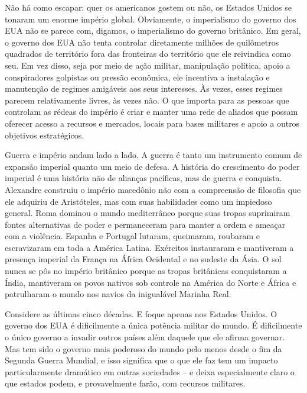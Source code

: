 Não há como escapar: quer os americanos gostem ou não, os Estados Unidos se tonaram um enorme império global. Obviamente, o imperialismo do governo dos EUA não se parece com, digamos, o imperialismo do governo britânico. Em geral, o governo dos EUA não tenta controlar diretamente milhões de quilômetros quadrados de território fora das fronteiras do território que ele reivindica como seu. Em vez disso, seja por meio de ação militar, manipulação política, apoio a conspiradores golpistas ou pressão econômica, ele incentiva a instalação e manutenção de regimes amigáveis aos seus interesses. Às vezes, esses regimes parecem relativamente livres, às vezes não. O que importa para as pessoas que controlam as rédeas do império é criar e manter uma rede de aliados que possam oferecer acesso a recursos e mercados, locais para bases militares e apoio a outros objetivos estratégicos.

Guerra e império andam lado a lado. A guerra é tanto um instrumento comum de expansão imperial quanto um meio de defesa. A história do crescimento do poder imperial é uma história não de alianças pacíficas, mas de guerra e conquista. Alexandre construiu o império macedônio não com a compreensão de filosofia que ele adquiriu de Aristóteles, mas com suas habilidades como um impiedoso general. Roma dominou o mundo mediterrâneo porque suas tropas suprimiram fontes alternativas de poder e permaneceram para manter a ordem e ameaçar com a violência. Espanha e Portugal lutaram, queimaram, roubaram e escravizaram em toda a América Latina. Exércitos instauraram e mantiveram a presença imperial da França na África Ocidental e no sudeste da Ásia. O sol nunca se pôs no império britânico porque as tropas britânicas conquistaram a Índia, mantiveram os povos nativos sob controle na América do Norte e África e patrulharam o mundo nos navios da inigualável Marinha Real.

Considere as últimas cinco décadas. E foque apenas nos Estados Unidos. O governo dos EUA é dificilmente a única potência militar do mundo. É dificilmente o único governo a invadir outros países além daquele que ele afirma governar. Mas tem sido o governo mais poderoso do mundo pelo menos desde o fim da Segunda Guerra Mundial, e isso significa que o que ele faz tem um impacto particularmente dramático em outras sociedades -- e deixa especialmente claro o que estados podem, e provavelmente farão, com recursos militares.


